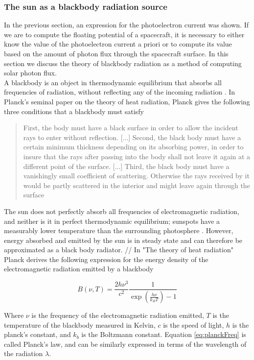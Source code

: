 \subsubsection*{The sun as a blackbody radiation source}
In the previous section, an expression for the photoelectron current was shown. If we are to compute the floating potential of a spacecraft, it is necessary to either know the value of the photoelectron current a priori or to compute its value based on the amount of photon flux through the spacecraft surface. In this section we discuss the theory of blackbody radiation as a method of computing solar photon flux.
\\
A blackbody is an object in thermodynamic equilibrium that absorbs all frequencies of radiation, without reflecting any of the incoming radiation \parencite{} . In Planck's seminal paper on the theory of heat radiation, Planck gives the following three conditions that a blackbody must satisfy \parencite{Planck}

\begin{quote}
    First, the body must have a black surface in order to allow the incident rays to enter without reflection. [...] Second, the black body must have a certain minimum thickness depending on its absorbing power, in order to insure that the rays after passing into the body shall not leave it again at a different point of the surface. [...] Third, the black body must have a vanishingly small coefficient of scattering. Otherwise the rays received by it would be partly scattered in the interior and might leave again through the surface
\end{quote}

The sun does not perfectly absorb all frequencies of electromagnetic radiation, and neither is it in perfect thermodynamic equilibrium; sunspots have a measurably lower temperature than the surrounding photosphere \parencite{Solanki2003}. However, energy absorbed and emitted by the sun is in steady state and can therefore be approximated as a black body radiator. 
//
In "The theory of heat radiation" Planck derives the following expression for the energy density of the electromagnetic radiation emitted by a blackbody  

\begin{equation}\label{eq:planckFreq}
    B(\nu, T) = \frac{2 h \nu^3}{c^2} \frac{1}{\exp(\frac{h \nu}{k_B T}) - 1}
\end{equation}

Where $\nu$ is the frequency of the electromagnetic radiation emitted, $T$ is the temperature of the blackbody measured in Kelvin, $c$ is the speed of light, $h$ is the planck's constant, and $k_b$ is the Boltzmann constant. Equation \eqref{eq:planckFreq} is called Planck's law, and can be similarly expressed in terms of the wavelength of the radiation $\lambda$.

